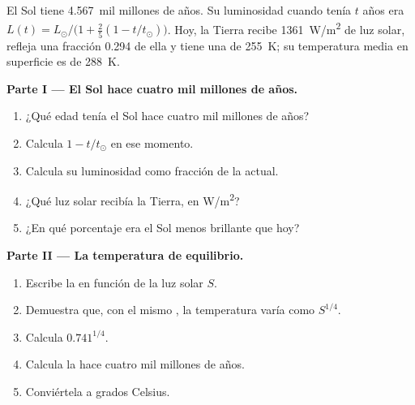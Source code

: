 \begin{problem}
\label{pb:g12:early-earth:1}
El Sol tiene \num{4.567}~mil millones de años. Su luminosidad cuando tenía
$t$ años era $L(t) = L_\odot/\bigl(1 + \tfrac25 (1 - t/t_\odot)\bigr)$. Hoy,
la Tierra recibe \qty{1361}{W/m^2} de luz solar, refleja una fracción 0.294
de ella y tiene una  de \qty{255}{K}; su temperatura
media en superficie es de \qty{288}{K}.

\medskip
\noindent\textbf{Parte I --- El Sol hace cuatro mil millones de años.}
\begin{enumerate}
  \item ¿Qué edad tenía el Sol hace cuatro mil millones de años?
  \item Calcula $1 - t/t_\odot$ en ese momento.
  \item Calcula su luminosidad como fracción de la actual.
  \item ¿Qué luz solar recibía la Tierra, en \unit{W/m^2}?
  \item ¿En qué porcentaje era el Sol menos brillante que hoy?
\end{enumerate}

\medskip
\noindent\textbf{Parte II --- La temperatura de equilibrio.}
\begin{enumerate}[resume]
  \item Escribe la  en función de la luz solar $S$.
  \item Demuestra que, con el mismo , la temperatura varía como
        $S^{1/4}$.
  \item Calcula $0.741^{1/4}$.
  \item Calcula la  hace cuatro mil millones de años.
  \item Conviértela a grados Celsius.
\end{enumerate}


\end{problem}
